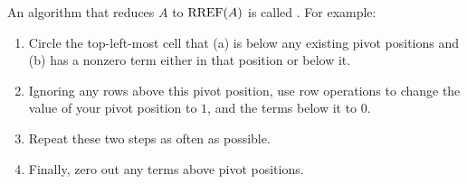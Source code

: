 
\begin{applicationActivities}{3}{5}

\begin{definition}
  An algorithm that reduces \(A\) to \(\operatorname{RREF}(A)\) is called
  . For example:
  \begin{multicols}{3}
    \begin{enumerate}
      \item Circle the top-left-most cell that (a) is below any existing pivot
      positions and (b) has a nonzero term either in that position or below it.
      \item Ignoring any rows above this pivot position, use row operations
      to change the value of your pivot position to \(1\), and the terms below
      it to \(0\).
      \item Repeat these two steps as often as possible.
      \item Finally,
      zero out any terms above pivot positions.
    \end{enumerate}
  \end{multicols}
\end{definition}


\end{applicationActivities}
